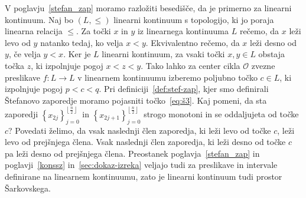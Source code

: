 \documentclass[../TG_magistrsko_delo_sections.tex]{subfiles}
\begin{document}
V poglavju~\ref{stefan_zap} moramo razložiti besedišče, da je primerno za linearni kontinuum. Naj bo $(L, \leq)$ linearni kontinuum s topologijo, ki jo poraja linearna relacija $\leq$. Za točki $x$ in $y$ iz linearnega kontinuuma $L$ rečemo, da $x$ leži levo od $y$ natanko tedaj, ko velja $x<y$. Ekvivalentno rečemo, da $x$ leži desno od $y$, če velja $y<x$. Ker je $L$ linearni kontinuum, za vsaki točki $x, y \in L$ obstaja točka $z$, ki izpolnjuje pogoj $x<z<y$. Tako lahko za center cikla $\mathcal{O}$ zvezne preslikave $f : L \to L$ v linearnem kontinuumu izberemo poljubno točko $c \in L$, ki izpolnjuje pogoj $p< c <q$. Pri definiciji~\ref{def:stef-zap}, kjer smo definirali Štefanovo zaporedje moramo pojasniti točko~\ref{eq:š3}. Kaj pomeni, da sta zaporedji 
$\left \{ x_{2j} \right \}_{j=0}^{\left \lfloor \frac{n}{2} \right \rfloor}$ 
    in
$\left \{ x_{2j+1} \right \}_{j=0}^{\left \lfloor \frac{n}{2} \right \rfloor}$
 strogo monotoni in se oddaljujeta od točke $c$?
Povedati želimo, da vsak naslednji člen zaporedja, ki leži levo od točke $c$, leži levo od prejšnjega člena. Vsak naslednji člen zaporedja, ki leži desno od točke $c$ pa leži desno od prejšnjega člena. Preostanek poglavja~\ref{stefan_zap} in poglavji~\ref{konssz} in~\ref{sec:dokaz-izreka} veljajo tudi za preslikave in intervale definirane na linearnem kontinuumu, zato je linearni kontinuum tudi prostor Šarkovskega.
\end{document}

